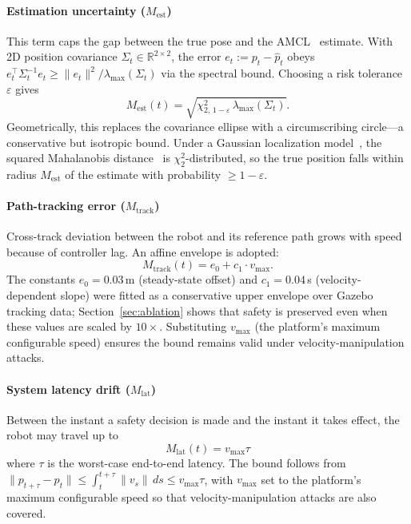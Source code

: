 \documentclass[conference]{IEEEtran}
\begin{document}
\paragraph{Estimation uncertainty ($M_{\mathrm{est}}$)}
This term caps the gap between the true pose and the AMCL~\cite{fox1999monte,fox2003adapting} estimate. With 2D position covariance $\Sigma_t \in \mathbb{R}^{2\times2}$, the error $e_t := p_t - \hat{p}_t$ obeys $e_t^\top \Sigma_t^{-1} e_t \ge \|e_t\|^2 / \lambda_{\max}(\Sigma_t)$ via the spectral bound. Choosing a risk tolerance $\varepsilon$ gives
\begin{equation}
M_{\mathrm{est}}(t) = \sqrt{\chi^2_{2,\,1-\varepsilon}\,\lambda_{\max}(\Sigma_t)}.
\end{equation}
Geometrically, this replaces the covariance ellipse with a circumscribing circle---a conservative but isotropic bound. Under a Gaussian localization model~\cite{thrun2005probabilistic}, the squared Mahalanobis distance~\cite{mahalanobis1936generalized} is $\chi^2_2$-distributed, so the true position falls within radius $M_{\mathrm{est}}$ of the estimate with probability $\ge 1{-}\varepsilon$.

\paragraph{Path-tracking error ($M_{\mathrm{track}}$)}
Cross-track deviation between the robot and its reference path grows with speed because of controller lag. An affine envelope is adopted:
\begin{equation}
M_{\mathrm{track}}(t) = e_0 + c_1 \cdot v_{\max}.
\end{equation}
The constants $e_0{=}0.03$\,m (steady-state offset) and $c_1{=}0.04$\,s (velocity-dependent slope) were fitted as a conservative upper envelope over Gazebo tracking data; Section~\ref{sec:ablation} shows that safety is preserved even when these values are scaled by $10\times$. Substituting $v_{\max}$ (the platform's maximum configurable speed) ensures the bound remains valid under velocity-manipulation attacks.

\paragraph{System latency drift ($M_{\mathrm{lat}}$)}
Between the instant a safety decision is made and the instant it takes effect, the robot may travel up to
\begin{equation}
M_{\mathrm{lat}}(t) = v_{\max}\tau
\end{equation}
where $\tau$ is the worst-case end-to-end latency. The bound follows from $\|p_{t+\tau}-p_t\| \le \int_t^{t+\tau}\|v_s\|\,ds \le v_{\max}\tau$, with $v_{\max}$ set to the platform's maximum configurable speed so that velocity-manipulation attacks are also covered.
\end{document}
